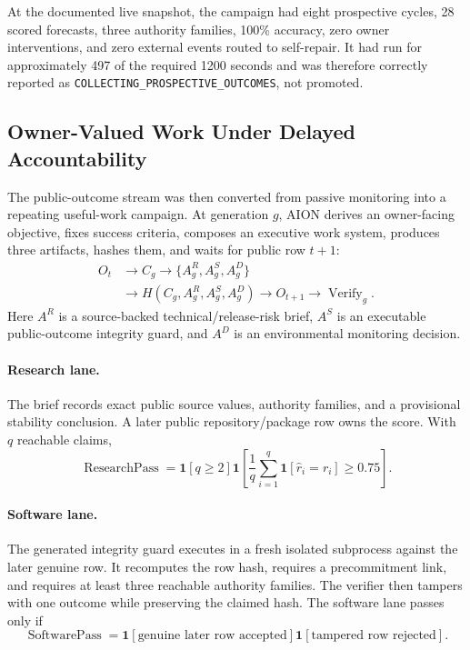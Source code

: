 At the documented live snapshot, the campaign had eight prospective cycles,
28 scored forecasts, three authority families, 100\% accuracy, zero owner
interventions, and zero external events routed to self-repair.  It had run for
approximately 497 of the required 1200 seconds and was therefore correctly
reported as \texttt{COLLECTING\_PROSPECTIVE\_OUTCOMES}, not promoted.

\subsection{Owner-Valued Work Under Delayed Accountability}
\label{subsec:aion-owner-valued-delayed-work}

The public-outcome stream was then converted from passive monitoring into a
repeating useful-work campaign.  At generation $g$, AION derives an owner-facing
objective, fixes success criteria, composes an executive work system, produces
three artifacts, hashes them, and waits for public row $t+1$:
\begin{equation}
\begin{aligned}
O_t
&\rightarrow C_g
\rightarrow \{A_g^{R},A_g^{S},A_g^{D}\} \\
&\rightarrow H(C_g,A_g^{R},A_g^{S},A_g^{D})
\rightarrow O_{t+1}
\rightarrow \operatorname{Verify}_g.
\end{aligned}
\label{eq:aion-owner-work-generation}
\end{equation}
Here $A^R$ is a source-backed technical/release-risk brief, $A^S$ is an
executable public-outcome integrity guard, and $A^D$ is an environmental
monitoring decision.

\paragraph{Research lane.}
The brief records exact public source values, authority families, and a
provisional stability conclusion.  A later public repository/package row owns
the score.  With $q$ reachable claims,
\begin{equation}
\operatorname{ResearchPass}=
\mathbf{1}[q\ge2]
\mathbf{1}\!\left[
\frac{1}{q}\sum_{i=1}^{q}\mathbf{1}[\widehat r_i=r_i]\ge0.75
\right].
\end{equation}

\paragraph{Software lane.}
The generated integrity guard executes in a fresh isolated subprocess against
the later genuine row.  It recomputes the row hash, requires a precommitment
link, and requires at least three reachable authority families.  The verifier
then tampers with one outcome while preserving the claimed hash.  The software
lane passes only if
\begin{equation}
\operatorname{SoftwarePass}=
\mathbf{1}[\text{genuine later row accepted}]
\mathbf{1}[\text{tampered row rejected}].
\end{equation}

